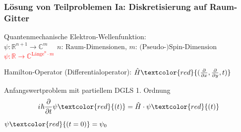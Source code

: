 \documentclass{beamer}
\newcommand{\iu}{{i\mkern1mu}} 	%
\newcommand{\absatz}{\vskip3mm}
\begin{document}
\begin{frame}[t] %
  \frametitle{Lösung von Teilproblemen Ia: Diskretisierung auf Raum-Gitter}
 Quantenmechanische Elektron-Wellenfunktion: \\
 \sout{$\psi: \mathbb{R}^{n+1} \rightarrow \mathbb{C}^m$} $ \quad \text{$n$: Raum-Dimensionen, $m$: (Pseudo-)Spin-Dimension}$
 \\
\textcolor{red}{$\psi: \mathbb{R} \rightarrow \mathbb{C}^{\text{Länge}^n\cdot m} $}

 \absatz
 Hamilton-Operator (Differentialoperator): $\hat{H}\textcolor{red}{(\frac{\partial}{\partial x}, \frac{\partial}{\partial y}, t)}$

 \begin{block}{Anfangswertproblem mit partiellem DGLS 1. Ordnung}
  \begin{equation*}
    \iu \hbar \frac{\partial}{\partial t}  \psi\textcolor{red}{(t)} = \hat{H} \cdot \psi\textcolor{red}{(t)} 
  \end{equation*}

    $\psi\textcolor{red}{(t=0)} =\psi_0$
    \end{block}
\end{frame}




\end{document}
